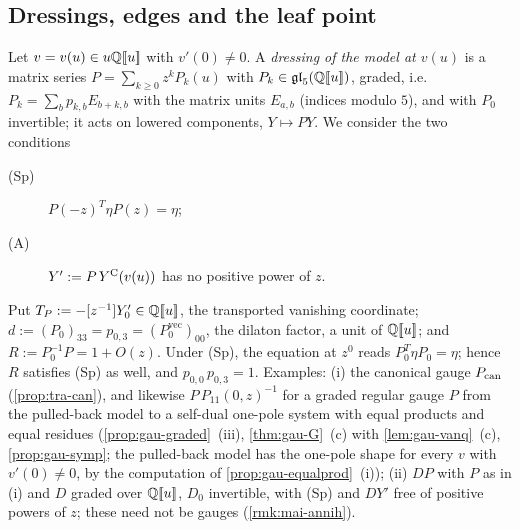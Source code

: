 
\subsection{Dressings, edges and the leaf point}
\label{sec:tra-dress}

\begin{defn}[dressings]
\label{def:tra-dressing}
Let $v = v(u)\in u\mathbb{Q}[\![ u ]\!]$ with $v'(0)\neq 0$. A \emph{dressing of the model at $v(u)$} is a matrix series $P = \sum_{k\geq 0}z^kP_k(u)$ with $P_k\in\mathfrak{gl}_5(\mathbb{Q}[\![ u ]\!])$, graded, i.e.\ $P_k = \sum_bp_{k,b}E_{b+k,b}$ with the matrix units $E_{a,b}$ (indices modulo $5$), and with $P_0$ invertible; it acts on lowered components, $Y\mapsto PY$. We consider the two conditions
\begin{description}
\item[(Sp)] $P(-z)^T\eta P(z) = \eta$;
\item[(A)] $Y' := P\,Y^{\mathrm{C}}(v(u))$ has no positive power of $z$.
\end{description}
Put $T_P := -[z^{-1}]Y'_0\in\mathbb{Q}[\![ u ]\!]$, the transported vanishing coordinate; $d := (P_0)_{33} = p_{0,3} = (P_0^{\mathrm{vec}})_{00}$, the dilaton factor, a unit of $\mathbb{Q}[\![ u ]\!]$; and $R := P_0^{-1}P = 1+O(z)$. Under (Sp), the equation at $z^0$ reads $P_0^T\eta P_0 = \eta$; hence $R$ satisfies (Sp) as well, and $p_{0,0}\,p_{0,3} = 1$. Examples: (i) the canonical gauge $P_{\mathrm{can}}$ (\cref{prop:tra-can}), and likewise $P\,P_{11}(0,z)^{-1}$ for a graded regular gauge $P$ from the pulled-back model to a self-dual one-pole system with equal products and equal residues (\cref{prop:gau-graded}~(iii), \cref{thm:gau-G}~(c) with \cref{lem:gau-vanq}~(c), \cref{prop:gau-symp}; the pulled-back model has the one-pole shape for every $v$ with $v'(0)\neq0$, by the computation of \cref{prop:gau-equalprod}~(i)); (ii) $DP$ with $P$ as in (i) and $D$ graded over $\mathbb{Q}[\![ u ]\!]$, $D_0$ invertible, with (Sp) and $DY'$ free of positive powers of $z$; these need not be gauges (\cref{rmk:mai-annih}).
\end{defn}

